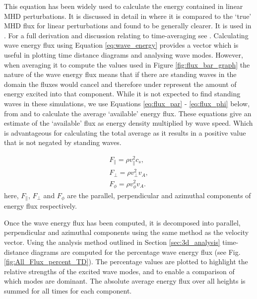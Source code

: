 This equation has been widely used to calculate the energy contained in linear MHD perturbations.
It is discussed in detail in \cite{bogdan2003} where it is compared to the `true' MHD flux for linear perturbations and found to be generally clearer. 
It is used in \cite{vigeesh2009, vigeesh2012, khomenko2012}. 
For a full derivation and discussion relating to time-averaging see \cite{leroy1985}.
Calculating wave energy flux using Equation \ref{eq:wave_energy} provides a vector which is useful in plotting time distance diagrams and analysing wave modes.
However, when averaging it to compute the values used in Figure \ref{fig:flux_bar_graph} the nature of the wave energy flux means that if there are standing waves in the domain the fluxes would cancel and therefore under represent the amount of energy excited into that component.
While it is not expected to find standing waves in these simulations, we use Equations \ref{eq:flux_par} - \ref{eq:flux_phi} below, from \citet{vigeesh2012} and \citet{khomenko2012} to calculate the average `available' energy flux.
These equations give an estimate of the `available' flux as energy density multiplied by wave speed.
Which is advantageous for calculating the total average as it results in a positive value that is not negated by standing waves.

\begin{align}
F_\parallel = \rho v_\parallel^2 c_s,\label{eq:flux_par}\\
F_\perp = \rho v_\perp^2 v_A,\label{eq:flux_perp}\\
F_\phi = \rho v_\phi^2v_A.\label{eq:flux_phi}
\end{align}
here, $F_\parallel$, $F_\perp$ and $F_\phi$ are the parallel, perpendicular and azimuthal components of energy flux respectively.

Once the wave energy flux has been computed, it is decomposed into parallel, perpendicular and azimuthal components using the same method as the velocity vector. 
Using the analysis method outlined in Section \ref{sec:3d_analysis} time-distance diagrams are computed for the percentage wave energy flux (see Fig. \ref{fig:All_Flux_percent_TD}). 
The percentage values are plotted to highlight the relative strengths of the excited wave modes, and to enable a comparison of which modes are dominant. 
The absolute average energy flux over all heights is summed for all times for each component.

